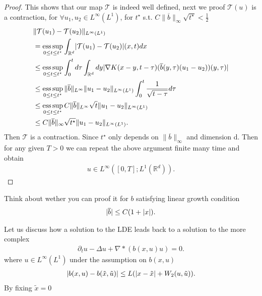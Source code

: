 \begin{proof}
  This shows that our map $\mathcal{T}$ is indeed well defined, next we proof $\mathcal{T}(u)$ is a contraction,
  for $\forall  u_{1},u_{2} \in  L^{\infty}(L^{1} ) $, for $t^{\star }$ s.t. $C \|\overline{b} \|_{\infty} \sqrt{t^{\star }} < \frac{1}{2} $
  \begin{align*}
    &\|\mathcal{T}(u_{1}) - \mathcal{T}(u_{2})\|_{L^{\infty}(L^{1} ) } \\
    &= \operatorname*{ess\,sup}_{0\le t\le t^{\star} }\int_{\mathbb{R}^{d} } \lvert\mathcal{T}(u_{1}) - \mathcal{T}(u_{2})\rvert(x,t)dx \\
    &\le  \operatorname*{ess\,sup}_{0\le t\le t^{\star} } \int_0^{t} d\tau  \int_{\mathbb{R}^{d} } dy \lvert\nabla K(x-y,t-\tau )(\overline{b}(y,\tau )(u_{1}-u_{2}) )(y,\tau ) \rvert\\
    &\le \operatorname*{ess\,sup}_{0\le t\le t^{\star} } \|\overline{b} \|_{L^{\infty} }  \|u_{1}-u_{2}\|_{L^{\infty}(L^{1} ) } \int_0^{t} \frac{1}{\sqrt{t-\tau } } d \tau \\
    &\le \operatorname*{ess\,sup}_{0\le t\le t^{\star} } C\|\overline{b} \|_{L^{\infty} } \sqrt{t}  \|u_{1}-u_{2}\|_{L^{\infty}(L^{1} ) }\\
    &\le C \|\overline{b} \|_{\infty} \sqrt{t^{\star }} \|u_{1}-u_{2}\|_{L^{\infty}(L^{1} ) }
  .\end{align*}
  Then  $\mathcal{T}$ is a contraction. Since $t^{\star }$ only depends on $\|\overline{b} \|_{\infty}$ and dimension d.
  Then for any given $T>0$ we can repeat the above argument finite many time and obtain
  \begin{align*}
    u \in  L^{\infty} ([0,T];L^{1}(\mathbb{R}^{d} ) )
  .\end{align*}
\end{proof}
\begin{exercise}
 Think about wether you can proof it for $b$   satisfying linear growth condition 
 \begin{align*}
  \lvert\overline{b} \rvert \le  C(1+\lvert x\rvert)
 .\end{align*}
\end{exercise}
Let us discuss how a solution to the LDE leads back to a solution to the more complex 
\begin{align*}
  \partial_t u - \Delta u + \nabla * (b(x,u)u) = 0
.\end{align*}
where $u \in  L^{\infty}(L^{1} ) $ under the assumption on $b(x,u)$
\begin{align*}
  \lvert b(x,u) - b(\tilde{x},\tilde{u}  )\rvert \le  L(\lvert x-\tilde{x} \rvert + W_2(u,\tilde{u} ))
.\end{align*}
By fixing  $\tilde{x} = 0 $
